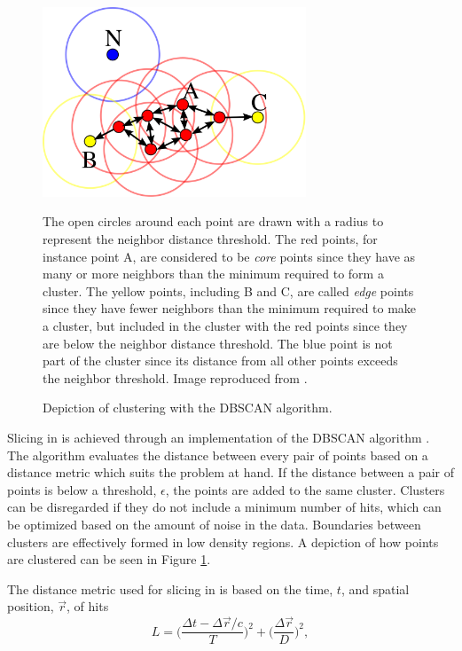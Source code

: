 \begin{figure}[t]
\begin{center}
\includegraphics[width=0.7\textwidth]{figures/figures/dbscan.png}
\end{center}
\caption{Depiction of clustering with the DBSCAN algorithm.}{
The open circles around each point are drawn with a radius to represent the
neighbor distance threshold.
The red points, for instance point A, are
considered to be \textit{core} points since they have as many or more neighbors
than the minimum required to form a cluster.  The yellow points, including B
and C, are called
\textit{edge} points since they have fewer neighbors than the minimum required
to make a cluster, but included in the cluster with the red points since they
are below the neighbor distance threshold.  The blue point is not part of the
cluster since its distance from all other points exceeds the neighbor threshold.
Image reproduced from \cite{dbscanWikiCitation}.
}
\label{dbscan}
\end{figure}

Slicing in \nova is achieved through an implementation of the DBSCAN algorithm
\cite{ester1996density,baird2015thesis}.
The algorithm evaluates the distance between every pair of points based on
a distance metric which suits the problem at hand.
If the distance between a pair of points is below a threshold, $\epsilon$, the
points are added to the same cluster.
Clusters can be disregarded if they do not include a minimum number of hits,
which can be optimized based on the amount of noise in the data.
Boundaries between clusters are effectively formed in low density regions.
A depiction of how points are clustered can be seen in Figure \ref{dbscan}.

The distance metric used for slicing in \nova is based on the time, $t$, and
spatial position, $\vec{r}$, of hits
\begin{equation}
L = \bigg( \frac{\Delta t - \Delta \vec{r} / c }{T} \bigg)^2 +
     \bigg( \frac{\Delta \vec{r}}{D} \bigg)^2,
\end{equation}

